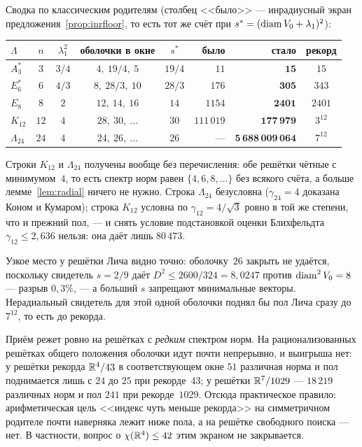 Сводка по классическим родителям (столбец <<было>> --- инрадиусный экран
предложения~\ref{prop:inrfloor}, то есть тот же счёт при
$s^{\ast}=(\operatorname{diam} V_0+\lambda_1)^2$):

\begin{center}\small
\begin{tabular}{lccccrrc}
\toprule
$\Lambda$ & $n$ & $\lambda_1^2$ & оболочки в окне & $s^{\ast}$ &
было & стало & рекорд\\
\midrule
$A_3^{*}$ & $3$ & $3/4$ & $4,\ 19/4,\ 5$ & $19/4$ & $11$ & $\mathbf{15}$ & $15$\\
$E_6^{*}$ & $6$ & $4/3$ & $8,\ 28/3,\ 10$ & $28/3$ & $176$ & $\mathbf{305}$ & $343$\\
$E_8$ & $8$ & $2$ & $12,\ 14,\ 16$ & $14$ & $1154$ & $\mathbf{2401}$ & $2401$\\
$K_{12}$ & $12$ & $4$ & $28,\ 30,\ \ldots$ & $30$ & $111\,019$ & $\mathbf{177\,979}$ & $3^{12}$\\
$\Lambda_{24}$ & $24$ & $4$ & $24,\ 26,\ \ldots$ & $26$ & --- & $\mathbf{5\,688\,009\,064}$ & $7^{12}$\\
\bottomrule
\end{tabular}
\end{center}

\noindent
Строки $K_{12}$ и $\Lambda_{24}$ получены вообще без перечисления: обе решётки
чётные с минимумом~$4$, то есть спектр норм равен $\{4,6,8,\dots\}$ без всякого
счёта, а больше лемме~\ref{lem:radial} ничего не нужно. Строка $\Lambda_{24}$
безусловна ($\gamma_{24}=4$ доказана Коном и Кумаром); строка $K_{12}$ условна
по $\gamma_{12}=4/\sqrt3$ ровно в той же степени, что и прежний пол, --- и
снять условие подстановкой оценки Блихфельдта $\gamma_{12}\le2{,}636$ нельзя:
она даёт лишь $80\,473$.

Узкое место у решётки Лича видно точно: оболочку~$26$ закрыть не удаётся,
поскольку свидетель $s=2/9$ даёт $D^2\le2600/324=8{,}0247$ против
$\operatorname{diam}^2V_0=8$ --- разрыв $0{,}3\%$, --- а больший $s$ запрещают минимальные
векторы. Нерадиальный свидетель для этой одной оболочки поднял бы пол Лича
сразу до $7^{12}$, то есть до рекорда.

\begin{remark}\label{rem:shellsilent}
Приём режет ровно на решётках с \emph{редким} спектром норм. На
рационализованных решётках общего положения оболочки идут почти непрерывно, и
выигрыша нет: у решётки рекорда $\mathbb{R}^4/43$ в соответствующем окне
$51$ различная норма и пол поднимается лишь с $24$ до $25$ при рекорде~$43$;
у решётки $\mathbb{R}^7/1029$ --- $18\,219$ различных норм и пол $241$ при
рекорде~$1029$. Отсюда практическое правило: арифметическая цель <<индекс чуть
меньше рекорда>> на симметричном родителе почти наверняка лежит ниже пола, а на
решётке свободного поиска --- нет. В частности, вопрос о $\chi(\mathbb{R}^4)\le42$
этим экраном не закрывается.
\end{remark}

